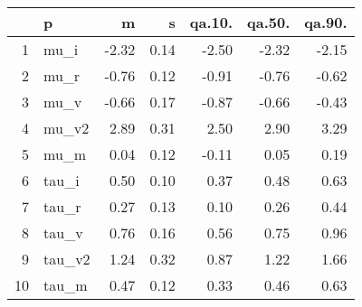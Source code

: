 \begin{table}[ht]
\centering
\begin{tabular}{rlrrrrr}
  \hline
 & p & m & s & qa.10. & qa.50. & qa.90. \\ 
  \hline
1 & mu\_i & -2.32 & 0.14 & -2.50 & -2.32 & -2.15 \\ 
  2 & mu\_r & -0.76 & 0.12 & -0.91 & -0.76 & -0.62 \\ 
  3 & mu\_v & -0.66 & 0.17 & -0.87 & -0.66 & -0.43 \\ 
  4 & mu\_v2 & 2.89 & 0.31 & 2.50 & 2.90 & 3.29 \\ 
  5 & mu\_m & 0.04 & 0.12 & -0.11 & 0.05 & 0.19 \\ 
  6 & tau\_i & 0.50 & 0.10 & 0.37 & 0.48 & 0.63 \\ 
  7 & tau\_r & 0.27 & 0.13 & 0.10 & 0.26 & 0.44 \\ 
  8 & tau\_v & 0.76 & 0.16 & 0.56 & 0.75 & 0.96 \\ 
  9 & tau\_v2 & 1.24 & 0.32 & 0.87 & 1.22 & 1.66 \\ 
  10 & tau\_m & 0.47 & 0.12 & 0.33 & 0.46 & 0.63 \\ 
   \hline
\end{tabular}
\label{tab:param}
\end{table}
